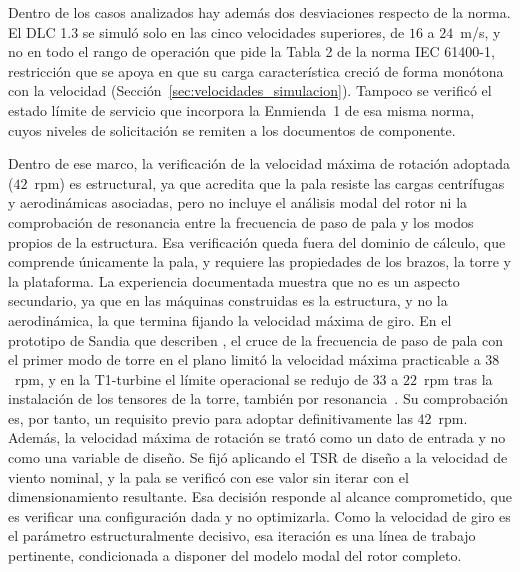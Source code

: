 Dentro de los casos analizados hay además dos desviaciones respecto de la norma. El DLC 1.3 se simuló solo en las cinco velocidades superiores, de $16$ a $24$~m/s, y no en todo el rango de operación que pide la Tabla 2 de la norma IEC 61400-1, restricción que se apoya en que su carga característica creció de forma monótona con la velocidad (Sección~\ref{sec:velocidades_simulacion}). Tampoco se verificó el estado límite de servicio que incorpora la Enmienda~1 de esa misma norma, cuyos niveles de solicitación se remiten a los documentos de componente.

Dentro de ese marco, la verificación de la velocidad máxima de rotación adoptada ($42$~rpm) es estructural, ya que acredita que la pala resiste las cargas centrífugas y aerodinámicas asociadas, pero no incluye el análisis modal del rotor ni la comprobación de resonancia entre la frecuencia de paso de pala y los modos propios de la estructura. Esa verificación queda fuera del dominio de cálculo, que comprende únicamente la pala, y requiere las propiedades de los brazos, la torre y la plataforma. La experiencia documentada muestra que no es un aspecto secundario, ya que en las máquinas construidas es la estructura, y no la aerodinámica, la que termina fijando la velocidad máxima de giro. En el prototipo de Sandia que describen \textcite{Sutherland2012}, el cruce de la frecuencia de paso de pala con el primer modo de torre en el plano limitó la velocidad máxima practicable a $38$~rpm, y en la T1-turbine el límite operacional se redujo de $33$ a $22$~rpm tras la instalación de los tensores de la torre, también por resonancia~\parencite{Mollerstrom2017}. Su comprobación es, por tanto, un requisito previo para adoptar definitivamente las $42$~rpm. Además, la velocidad máxima de rotación se trató como un dato de entrada y no como una variable de diseño. Se fijó aplicando el TSR de diseño a la velocidad de viento nominal, y la pala se verificó con ese valor sin iterar con el dimensionamiento resultante. Esa decisión responde al alcance comprometido, que es verificar una configuración dada y no optimizarla. Como la velocidad de giro es el parámetro estructuralmente decisivo, esa iteración es una línea de trabajo pertinente, condicionada a disponer del modelo modal del rotor completo.

